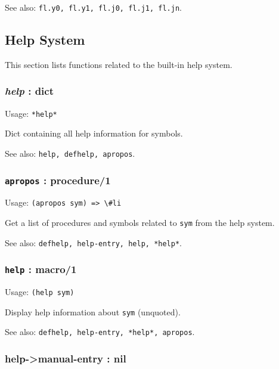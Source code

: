 \documentclass[
]{article}
\newcommand{\passthrough}[1]{#1}
\begin{document}
See also: \passthrough{\lstinline!fl.y0, fl.y1, fl.j0, fl.j1, fl.jn!}.

\hypertarget{help-system}{%
\subsection{Help System}\label{help-system}}

This section lists functions related to the built-in help system.

\hypertarget{help-dict}{%
\subsubsection{\texorpdfstring{\emph{help} :
dict}{help : dict}}\label{help-dict}}

Usage: \passthrough{\lstinline!*help*!}

Dict containing all help information for symbols.

See also: \passthrough{\lstinline!help, defhelp, apropos!}.

\hypertarget{apropos-procedure1}{%
\subsubsection{\texorpdfstring{\texttt{apropos} :
procedure/1}{apropos : procedure/1}}\label{apropos-procedure1}}

Usage: \passthrough{\lstinline!(apropos sym) => \#li!}

Get a list of procedures and symbols related to
\passthrough{\lstinline!sym!} from the help system.

See also: \passthrough{\lstinline!defhelp, help-entry, help, *help*!}.

\hypertarget{help-macro1}{%
\subsubsection{\texorpdfstring{\texttt{help} :
macro/1}{help : macro/1}}\label{help-macro1}}

Usage: \passthrough{\lstinline!(help sym)!}

Display help information about \passthrough{\lstinline!sym!} (unquoted).

See also:
\passthrough{\lstinline!defhelp, help-entry, *help*, apropos!}.

\hypertarget{help-manual-entry-nil}{%
\subsubsection{help-\textgreater manual-entry :
nil}\label{help-manual-entry-nil}}
\end{document}
